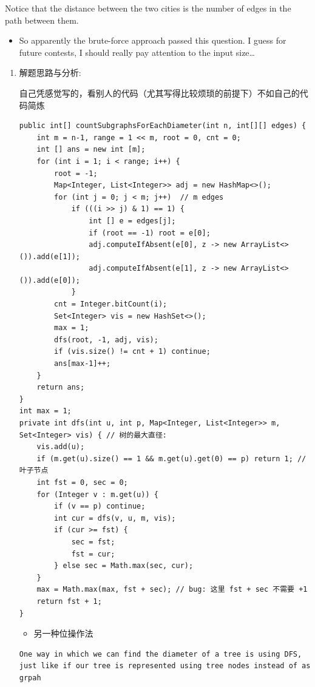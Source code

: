 \documentclass[9pt, b5paaper]{book}
\begin{document}
Notice that the distance between the two cities is the number of edges in the path between them.
\begin{itemize}
\item So apparently the brute-force approach passed this question. I guess for future contests, I should really pay attention to the input size\ldots{}
\end{itemize}
\begin{enumerate}
\item 解题思路与分析:
\label{sec-2-1-6-1}

自己凭感觉写的，看别人的代码（尤其写得比较烦琐的前提下）不如自己的代码简炼

\begin{verbatim}
public int[] countSubgraphsForEachDiameter(int n, int[][] edges) { 
    int m = n-1, range = 1 << m, root = 0, cnt = 0;
    int [] ans = new int [m];
    for (int i = 1; i < range; i++) {
        root = -1;
        Map<Integer, List<Integer>> adj = new HashMap<>();
        for (int j = 0; j < m; j++)  // m edges
            if (((i >> j) & 1) == 1) {
                int [] e = edges[j];
                if (root == -1) root = e[0];
                adj.computeIfAbsent(e[0], z -> new ArrayList<>()).add(e[1]);
                adj.computeIfAbsent(e[1], z -> new ArrayList<>()).add(e[0]);
            }
        cnt = Integer.bitCount(i);
        Set<Integer> vis = new HashSet<>();
        max = 1;
        dfs(root, -1, adj, vis);
        if (vis.size() != cnt + 1) continue;
        ans[max-1]++;
    }
    return ans;
}
int max = 1;
private int dfs(int u, int p, Map<Integer, List<Integer>> m, Set<Integer> vis) { // 树的最大直径:
    vis.add(u);
    if (m.get(u).size() == 1 && m.get(u).get(0) == p) return 1; // 叶子节点 
    int fst = 0, sec = 0;
    for (Integer v : m.get(u)) {
        if (v == p) continue;
        int cur = dfs(v, u, m, vis);
        if (cur >= fst) {
            sec = fst;
            fst = cur;
        } else sec = Math.max(sec, cur);
    }
    max = Math.max(max, fst + sec); // bug: 这里 fst + sec 不需要 +1
    return fst + 1;
}
\end{verbatim}
\begin{itemize}
\item 另一种位操作法
\end{itemize}
\begin{verbatim}
One way in which we can find the diameter of a tree is using DFS, just like if our tree is represented using tree nodes instead of as grpah

\end{verbatim}
\end{enumerate}
\end{document}
